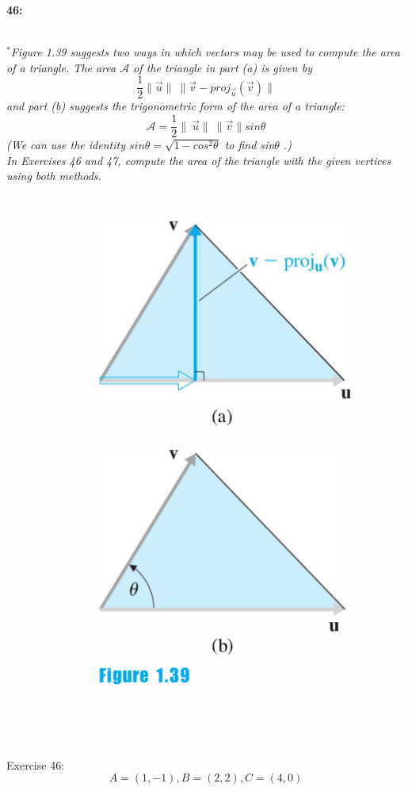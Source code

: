 \documentclass[12pt,letterpaper]{hmcpset}
\begin{document}
\begin{problem}
\textbf{46:}\\
 \\
\begin{minipage}{0.5\textwidth}
\textit{$^*$Figure 1.39 suggests two ways in which vectors
may be used to compute the area of a triangle. The area $\mathcal{A}$ of the triangle in part (a) is given by \[ \frac{1}{2} \| \vec{u} \|\ \|\vec{v} - proj_{\vec{u}}(\vec{v}) \|  \]
and part (b) suggests the trigonometric form of the
area of a triangle: \[ \mathcal{A} = \frac{1}{2} \| \ \vec{u} \| \ \| \vec{v} \| sin \theta \] (We can use the
identity $sin  \theta = \sqrt{ 1 - cos^2 \theta }$ to find sin$\theta$ .)\\
In Exercises 46 and 47, compute the area of the triangle
with the given vertices using both methods. }
\end{minipage}
\begin{minipage}{0.5\textwidth}
\includegraphics[scale=.25]{fig139}
\end{minipage}
\\
 \\
Exercise 46: \\
\[ A = (1, -1), B = (2,2), C = (4, 0)\]
\end{problem}
\end{document}
